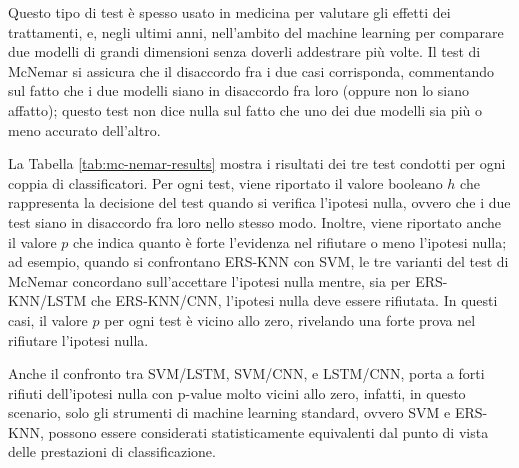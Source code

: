 Questo tipo di test è spesso usato in medicina per valutare gli effetti dei trattamenti, e, negli ultimi anni, nell'ambito del machine learning per comparare due modelli di grandi dimensioni senza doverli addestrare più volte. Il test di McNemar si assicura che il disaccordo fra i due casi corrisponda, commentando sul fatto che i due modelli siano in disaccordo fra loro (oppure non lo siano affatto); questo test non dice nulla sul fatto che uno dei due modelli sia più o meno accurato dell'altro.

La Tabella \ref{tab:mc-nemar-results} mostra i risultati dei tre test condotti per ogni coppia di classificatori.
Per ogni test, viene riportato il valore booleano $h$ che rappresenta la decisione del test quando si verifica l'ipotesi nulla, ovvero che i due test siano in disaccordo fra loro nello stesso modo.
Inoltre, viene riportato anche il valore $p$ che indica quanto è forte l'evidenza nel rifiutare o meno l'ipotesi nulla; ad esempio, quando si confrontano ERS-KNN con SVM, le tre varianti del test di McNemar concordano sull'accettare l'ipotesi nulla mentre, sia per ERS-KNN/LSTM che ERS-KNN/CNN, l'ipotesi nulla deve essere rifiutata. In questi casi, il valore $p$ per ogni test è vicino allo zero, rivelando una forte prova nel rifiutare l'ipotesi nulla.

Anche il confronto tra SVM/LSTM, SVM/CNN, e LSTM/CNN, porta a forti rifiuti dell'ipotesi nulla con p-value molto vicini allo zero, infatti, in questo scenario, solo gli strumenti di machine learning standard, ovvero SVM e ERS-KNN, possono essere considerati statisticamente equivalenti dal punto di vista delle prestazioni di classificazione.

